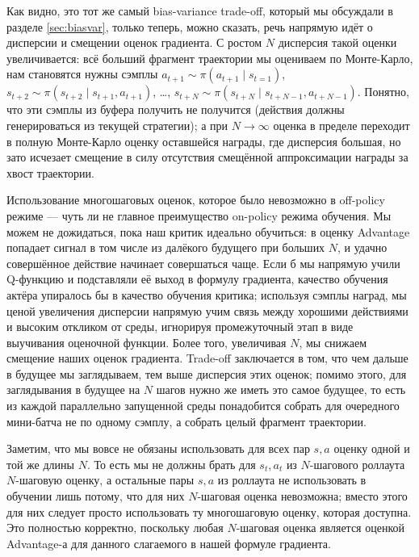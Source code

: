 Как видно, это тот же самый bias-variance trade-off, который мы обсуждали в разделе \ref{sec:biasvar}, только теперь, можно сказать, речь напрямую идёт о дисперсии и смещении оценок градиента. С ростом $N$ дисперсия такой оценки увеличивается: всё больший фрагмент траектории мы оцениваем по Монте-Карло, нам становятся нужны сэмплы $a_{t+1} \sim \pi(a_{t+1} \mid s_{t=1})$, $s_{t+2} \sim \pi(s_{t+2} \mid s_{t+1}, a_{t+1})$, \dots , $s_{t+N} \sim \pi(s_{t+N} \mid s_{t+N-1}, a_{t+N-1})$. Понятно, что эти сэмплы из буфера получить не получится (действия должны генерироваться из текущей стратегии); а при $N \to \infty$ оценка в пределе переходит в полную Монте-Карло оценку оставшейся награды, где дисперсия большая, но зато исчезает смещение в силу отсутствия смещённой аппроксимации награды за хвост траектории.

Использование многошаговых оценок, которое было невозможно в off-policy режиме --- чуть ли не главное преимущество on-policy режима обучения. Мы можем не дожидаться, пока наш критик идеально обучиться: в оценку Advantage попадает сигнал в том числе из далёкого будущего при больших $N$, и удачно совершённое действие начинает совершаться чаще. Если б мы напрямую учили Q-функцию и подставляли её выход в формулу градиента, качество обучения актёра упиралось бы в качество обучения критика; используя сэмплы наград, мы ценой увеличения дисперсии напрямую учим связь между хорошими действиями и высоким откликом от среды, игнорируя промежуточный этап в виде выучивания оценочной функции. Более того, увеличивая $N$, мы снижаем смещение наших оценок градиента. Trade-off заключается в том, что чем дальше в будущее мы заглядываем, тем выше дисперсия этих оценок; помимо этого, для заглядывания в будущее на $N$ шагов нужно же иметь это самое будущее, то есть из каждой параллельно запущенной среды понадобится собрать для очередного мини-батча не по одному сэмплу, а собрать целый фрагмент траектории.

Заметим, что мы вовсе не обязаны использовать для всех пар $s, a$ оценку одной и той же длины $N$. То есть мы не должны брать для $s_t, a_t$ из $N$-шагового роллаута $N$-шаговую оценку, а остальные пары $s, a$ из роллаута не использовать в обучении лишь потому, что для них $N$-шаговая оценка невозможна; вместо этого для них следует просто использовать ту многошаговую оценку, которая доступна. Это полностью корректно, поскольку любая $N$-шаговая оценка является оценкой Advantage-а для данного слагаемого в нашей формуле градиента. 

